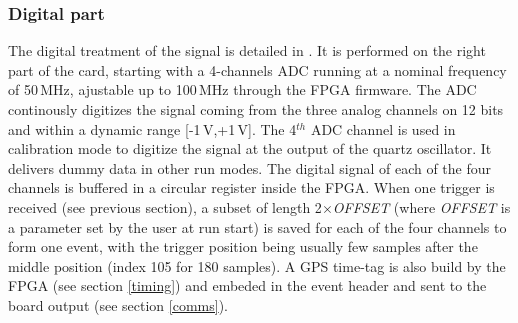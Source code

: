 \subsubsection{Digital part}
\label{digital}
The digital treatment of the signal is detailed in \cite{GP35daq}. It is performed on the right part of the card, starting with a 4-channels ADC \cite{ADCdoc} running at a nominal frequency of 50\,MHz, ajustable up to 100\,MHz through the FPGA firmware. The ADC continously digitizes the signal coming from the three analog channels on 12 bits and within a dynamic range [-1\,V,+1\,V]. The 4$^{th}$ ADC channel is used in calibration mode to digitize the signal at the output of the quartz oscillator. It delivers dummy data in other run modes. The digital signal of each of the four channels is buffered in a circular register inside the FPGA. When one trigger is received (see previous section), a subset of length 2$\times${\it OFFSET} (where {\it OFFSET} is a parameter set by the user at run start) is saved for each of the four channels to form one event, with the trigger position being usually few samples after the middle position (index 105 for 180 samples). A GPS time-tag is also build  by the FPGA (see section \ref{timing}) and embeded in the event header and sent to the board output (see section \ref{comms}).

